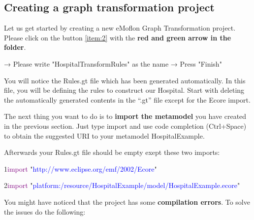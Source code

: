 \clearpage

\subsection{Creating a graph transformation project}

Let us get started by creating a new eMoflon Graph Transformation project. Please click on the button \ref{item:2} with the \textbf{red and green arrow in the folder}.\newline\newline

\centering

→ Please write \textsf{"HospitalTransformRules"} as the name → Press \textsf{"Finish"} \newline\newline

\raggedright

You will notice the \textsf{Rules.gt} file which has been generated automatically. In this file, you will be defining the rules to construct our Hospital.\newline
Start with deleting the automatically generated contents in the “.gt” file except for the Ecore import.

The next thing you want to do is to \textbf{import the metamodel} you have created in the previous section. Just type import and use code completion (Ctrl+Space) to obtain the suggested URI to your metamodel HospitalExample.\newline

Afterwards your \textsf{Rules.gt} file should be empty exept these two imports:\newline

{

1\hspace{0.5cm}\textcolor{Purple}{import} "\textcolor{Blue}{http://www.eclipse.org/emf/2002/Ecore}"

2\hspace{0.5cm}\textcolor{Purple}{import} "\textcolor{Blue}{platform:/resource/HospitalExample/model/HospitalExample.ecore}"\newline

}

You might have noticed that the project has some \textbf{compilation errors}. To solve the issues do the following:\newline\newline

\centering

